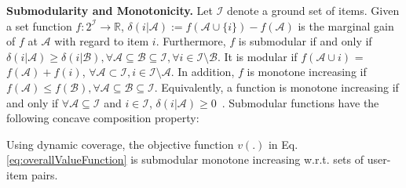 \vspace{4mm}
\noindent \textbf{Submodularity and Monotonicity.}
Let $\mathcal{I}$  denote a ground set  of items.  Given a  set function $f:2^{\mathcal{I}} \rightarrow \mathbb{R}$,  $\delta(i|\mathcal{A}) :=  f(\mathcal{A} \cup\{i\}) - f(\mathcal{A})$ is the marginal gain of $f$ at $\mathcal{A}$ with regard to item $i$.  Furthermore, $f$ is  submodular if and only if  $\delta(i|\mathcal{A}) \geq \delta(i|\mathcal{B}), \forall \mathcal{A}\subseteq \mathcal{B} \subseteq \mathcal{I}, \forall i \in \mathcal{I}\setminus \mathcal{B}$. It is modular if $f(\mathcal{A} \cup {i})$ = $f(\mathcal{A}) + f(i)$, $\forall \mathcal{A} \subset \mathcal{I}, i \in \mathcal{I} \setminus \mathcal{A}$. In addition,  $f$ is  monotone increasing if $ f(\mathcal{A}) \le f(\mathcal{B}), \forall \mathcal{A}\subseteq \mathcal{B}\subseteq \mathcal{I}$. Equivalently, a function is monotone increasing if and only if $\forall \mathcal{A} \subseteq \mathcal{I}$ and $i \in \mathcal{I}$, $\delta(i|\mathcal{A}) \geq 0$~\cite{krause2012submodular}.
Submodular functions have the following concave composition property:

\begin{theorem}
Using dynamic coverage, the objective function $v(.)$ in Eq.\ref{eq:overallValueFunction} is submodular monotone increasing w.r.t. sets of user-item pairs. 
\end{theorem}

